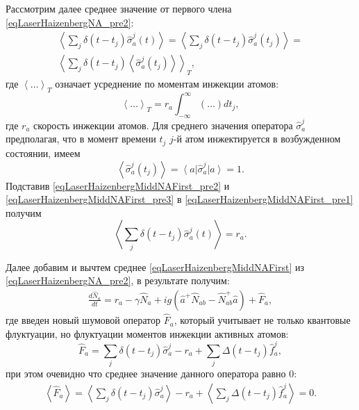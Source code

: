 Рассмотрим далее среднее значение от первого члена \eqref{eqLaserHaizenbergNA_pre2}:
\begin{eqnarray}
\left<\sum_j \delta\left(t -
t_j\right)\hat{\sigma}^{j}_{a}\left(t\right)\right> = 
\left<\sum_j \delta\left(t -
t_j\right)\hat{\sigma}^{j}_{a}\left(t_j\right)\right> =
\nonumber \\
\left<\sum_j \delta\left(t -
t_j\right)\left<\hat{\sigma}^{j}_{a}\left(t_j\right)\right>\right>_T,
\label{eqLaserHaizenbergMiddNAFirst_pre1}
\end{eqnarray}
где $\left<\dots\right>_T$ означает усреднение по моментам инжекции
атомов:
\begin{equation}
\left<\dots\right>_T =
r_a\int_{-\infty}^{\infty}\left(\dots\right)d t_j,
\label{eqLaserHaizenbergMiddNAFirst_pre2}
\end{equation}
где $r_a$ скорость инжекции атомов. 
Для среднего значения оператора $\hat{\sigma}^{j}_{a}$
предполагая, что в момент времени $t_j$ $j$-й атом инжектируется в
возбужденном состоянии, имеем
\begin{equation}
\left<\hat{\sigma}^{j}_{a}\left(t_j\right)\right> = 
\left<a\right|\hat{\sigma}^{j}_{a}\left|a\right> = 1.
\label{eqLaserHaizenbergMiddNAFirst_pre3}
\end{equation}  
Подставив \eqref{eqLaserHaizenbergMiddNAFirst_pre2} и
\eqref{eqLaserHaizenbergMiddNAFirst_pre3} в
\eqref{eqLaserHaizenbergMiddNAFirst_pre1} получим
\begin{equation}
\left<\sum_j \delta\left(t -
t_j\right)\hat{\sigma}^{j}_{a}\left(t\right)\right> = r_a.
\label{eqLaserHaizenbergMiddNAFirst}
\end{equation}

Далее добавим и вычтем среднее \eqref{eqLaserHaizenbergMiddNAFirst}
из \eqref{eqLaserHaizenbergNA_pre2}, в результате получим:
\begin{eqnarray}
\frac{d \hat{N}_{a}}{d t} 
= r_a  - \gamma
\hat{N}_{a} 
+ i g  \left(
\hat{a}^{+}\hat{N}_{ab} -
\hat{N}_{ab}^{+}\hat{a}
\right) + \hat{F}_{a},
\label{eqLaserHaizenbergNA}
\end{eqnarray}
где введен новый шумовой оператор $\hat{F}_{a}$, который учитывает не только
квантовые флуктуации, но флуктуации моментов инжекции активных атомов:
\begin{equation}
\hat{F}_{a} = \sum_j \delta\left(t - t_j\right)\hat{\sigma}^{j}_{a} -
r_a + \sum_j \Delta\left(t - t_j\right) \hat{f}_{a}^{j}, 
\label{eqLaserHaizenbergFNA}
\end{equation}
при этом очевидно что среднее значение данного оператора равно 0:
\begin{eqnarray}
\left<\hat{F}_{a}\right> = \left<\sum_j \delta\left(t - t_j\right)\hat{\sigma}^{j}_{a}\right> -
r_a + \left<\sum_j \Delta\left(t - t_j\right)
\hat{f}_{a}^{j}\right> = 0. 
\nonumber
\end{eqnarray}

